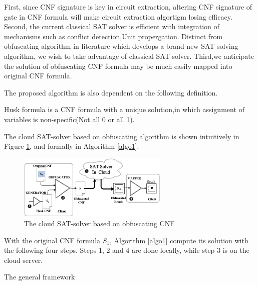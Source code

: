 \documentclass[runningheads,a4paper]{llncs}
\begin{document}
First, since CNF signature is key in circuit extraction, altering CNF signature of gate in CNF formula will make circuit extraction algortigm losing efficacy.
Second, the current classical SAT solver \cite{t10} is efficient with integration of mechanisms such as conflict detection,Unit propergation.
Distinct from obfuscating algorithm in literature\cite{t11} which develops a brand-new SAT-solving algorithm, we wish to take advantage of classical SAT solver.
Third,we anticipate the solution of obfuscating CNF formula may be much easily mapped into original CNF formula.

The proposed algorithm is also dependent on the following definition.

\begin{definition}
Husk formula is a CNF formula with a unique solution,in which assignment of variables is non-specific(Not all 0 or all 1).
\end{definition}

The cloud SAT-solver based on obfuscating algorithm is shown intuitively in Figure \ref{fig_cldSAT},
and formally in  Algorithm \ref{algo1}.
\begin{figure}
\centering
\includegraphics[width=7.2cm]{a5}
\caption{The cloud SAT-solver based on obfuscating CNF}
\label{fig_cldSAT}
\end{figure}

With the original CNF formula $S_1$, 
Algorithm \ref{algo1} compute its solution with the following four steps. 
Steps 1, 2 and 4 are done locally,
while step 3 is on the cloud server.

\begin{algorithm}[t]
\caption{The general framework}
\label{algo1}
\end{algorithm}
\end{document}
